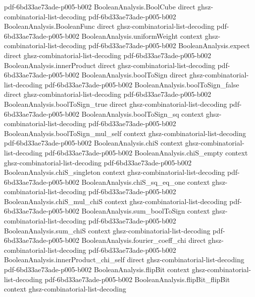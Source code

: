 \begin{lemma}
  {pdf-6bd33ae73ade-p005-b002}
\proofstep
  {BooleanAnalysis.BoolCube}
  {direct}
  {ghsz-combinatorial-list-decoding}
  {pdf-6bd33ae73ade-p005-b002}
\proofstep
  {BooleanAnalysis.BooleanFunc}
  {direct}
  {ghsz-combinatorial-list-decoding}
  {pdf-6bd33ae73ade-p005-b002}
\proofstep
  {BooleanAnalysis.uniformWeight}
  {context}
  {ghsz-combinatorial-list-decoding}
  {pdf-6bd33ae73ade-p005-b002}
\proofstep
  {BooleanAnalysis.expect}
  {direct}
  {ghsz-combinatorial-list-decoding}
  {pdf-6bd33ae73ade-p005-b002}
\proofstep
  {BooleanAnalysis.innerProduct}
  {direct}
  {ghsz-combinatorial-list-decoding}
  {pdf-6bd33ae73ade-p005-b002}
\proofstep
  {BooleanAnalysis.boolToSign}
  {direct}
  {ghsz-combinatorial-list-decoding}
  {pdf-6bd33ae73ade-p005-b002}
\proofstep
  {BooleanAnalysis.boolToSign_false}
  {direct}
  {ghsz-combinatorial-list-decoding}
  {pdf-6bd33ae73ade-p005-b002}
\proofstep
  {BooleanAnalysis.boolToSign_true}
  {direct}
  {ghsz-combinatorial-list-decoding}
  {pdf-6bd33ae73ade-p005-b002}
\proofstep
  {BooleanAnalysis.boolToSign_sq}
  {context}
  {ghsz-combinatorial-list-decoding}
  {pdf-6bd33ae73ade-p005-b002}
\proofstep
  {BooleanAnalysis.boolToSign_mul_self}
  {context}
  {ghsz-combinatorial-list-decoding}
  {pdf-6bd33ae73ade-p005-b002}
\proofstep
  {BooleanAnalysis.chiS}
  {context}
  {ghsz-combinatorial-list-decoding}
  {pdf-6bd33ae73ade-p005-b002}
\proofstep
  {BooleanAnalysis.chiS_empty}
  {context}
  {ghsz-combinatorial-list-decoding}
  {pdf-6bd33ae73ade-p005-b002}
\proofstep
  {BooleanAnalysis.chiS_singleton}
  {context}
  {ghsz-combinatorial-list-decoding}
  {pdf-6bd33ae73ade-p005-b002}
\proofstep
  {BooleanAnalysis.chiS_sq_eq_one}
  {context}
  {ghsz-combinatorial-list-decoding}
  {pdf-6bd33ae73ade-p005-b002}
\proofstep
  {BooleanAnalysis.chiS_mul_chiS}
  {context}
  {ghsz-combinatorial-list-decoding}
  {pdf-6bd33ae73ade-p005-b002}
\proofstep
  {BooleanAnalysis.sum_boolToSign}
  {context}
  {ghsz-combinatorial-list-decoding}
  {pdf-6bd33ae73ade-p005-b002}
\proofstep
  {BooleanAnalysis.sum_chiS}
  {context}
  {ghsz-combinatorial-list-decoding}
  {pdf-6bd33ae73ade-p005-b002}
\proofstep
  {BooleanAnalysis.fourier_coeff_chi}
  {direct}
  {ghsz-combinatorial-list-decoding}
  {pdf-6bd33ae73ade-p005-b002}
\proofstep
  {BooleanAnalysis.innerProduct_chi_self}
  {direct}
  {ghsz-combinatorial-list-decoding}
  {pdf-6bd33ae73ade-p005-b002}
\proofstep
  {BooleanAnalysis.flipBit}
  {context}
  {ghsz-combinatorial-list-decoding}
  {pdf-6bd33ae73ade-p005-b002}
\proofstep
  {BooleanAnalysis.flipBit_flipBit}
  {context}
  {ghsz-combinatorial-list-decoding}

\end{lemma}
